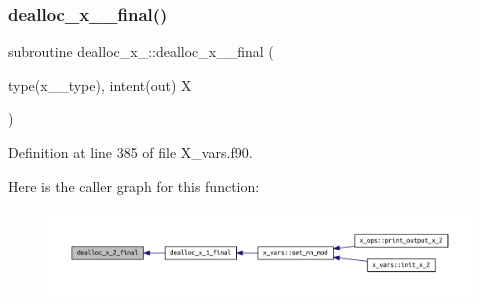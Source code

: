 \subsubsection{\texorpdfstring{dealloc\+\_\+x\+\_\+\_\+final()}{dealloc\_x\_2\_final()}}
{\footnotesize\ttfamily subroutine dealloc\+\_\+x\+\_\+::dealloc\+\_\+x\+\_\+\_\+final (\begin{DoxyParamCaption}\item[{type(x\+\_\+2\+\_\+type), intent(out)}]{X }\end{DoxyParamCaption})}



Definition at line 385 of file X\+\_\+vars.\+f90.

Here is the caller graph for this function\+:
\nopagebreak
\begin{figure}[H]
\begin{center}
\leavevmode
\includegraphics[width=350pt]{X__vars_8f90_ad33ba3e63c71fe167351af3317dc22ec_icgraph}
\end{center}
\end{figure}
